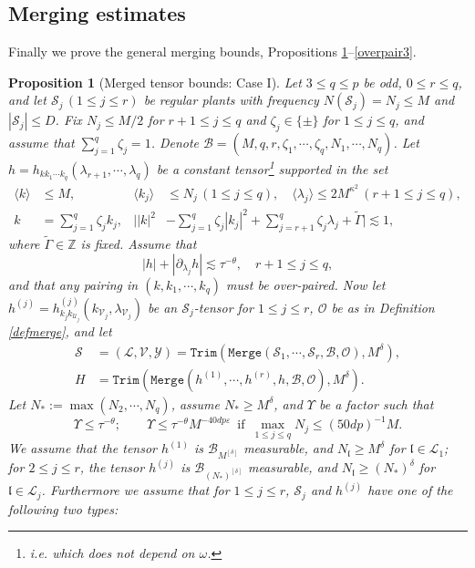 \documentclass[11 pt,reqno]{amsart}
\newtheorem{prop}[thm]{Proposition}
\theoremstyle{definition}
\theoremstyle{remark}
\numberwithin{equation}{section}
\newcommand{\Sc}{\mathcal{S}}
\newcommand{\Lc}{\mathcal{L}}
\newcommand{\Uc}{\mathcal{U}}
\newcommand{\Bc}{\mathcal{B}}
\newcommand{\Vc}{\mathcal{V}}
\newcommand{\Yc}{\mathcal{Y}}
\newcommand{\Zb}{\mathbb{Z}}
\newcommand{\lf}{\mathfrak{l}}
\newcommand{\Bs}{\mathscr{B}}
\newcommand{\Os}{\mathscr{O}}
\begin{document}
{\subsection{Merging estimates}\label{6.3} Finally we prove the general merging bounds, Propositions \ref{overpair}--\ref{overpair3}.
\begin{prop}[Merged tensor bounds: Case I]\label{overpair} Let $3\leq q\leq p$ be odd, $0\leq r\leq q$, and let $\Sc_j\,(1\leq j\leq r)$ be regular plants with frequency $N(\Sc_j)=N_j\leq M$ and $|\Sc_j|\leq D$. Fix  $N_j\leq M/2$ for $r+1\leq j\leq q$ and $\zeta_j\in\{\pm\}$ for $1\leq j\leq q$, and assume that $\sum_{j=1}^q\zeta_j=1$. Denote $\Bs=(M,q,r,\zeta_1,\cdots,\zeta_q,N_1,\cdots,N_q)$. Let $h=h_{kk_1\cdots k_q}(\lambda_{r+1},\cdots,\lambda_q)$ be a constant tensor\footnote{i.e. which does not depend on $\omega$.} supported in the set \begin{equation}\label{mergesupp}
\begin{aligned}\langle k\rangle&\leq M,&\langle k_j\rangle&\leq N_j\,(1\leq j\leq q),\quad\langle\lambda_j\rangle\leq 2M^{\kappa^2}\,(r+1\leq j\leq q),\\
k&=\sum_{j=1}^q\zeta_jk_j,&\bigg||k|^2&-\sum_{j=1}^q\zeta_j|k_j|^2+\sum_{j=r+1}^q\zeta_j\lambda_j+\widetilde{\Gamma}\bigg|\lesssim 1,
\end{aligned}\end{equation} where $\widetilde{\Gamma}\in\Zb$ is fixed. Assume that
\begin{equation}\label{mergetensor}|h|+|\partial_{\lambda_j}h|\lesssim \tau^{-\theta},\quad r+1\leq j\leq q,
\end{equation} 
and that any pairing in $(k,k_1,\cdots,k_q)$ must be over-paired.
Now let $h^{(j)}=h_{k_jk_{\Uc_j}}^{(j)}(k_{\Vc_j},\lambda_{\Vc_j})$ be an $\Sc_j$-tensor for $1\leq j\leq r$, $\Os$ be as in Definition \ref{defmerge}, and let
\begin{equation}\label{mergetrim}
\begin{aligned}\Sc&=(\Lc,\Vc,\Yc)=\mathtt{Trim}(\mathtt{Merge}(\Sc_1,\cdots,\Sc_r,\Bs,\Os),M^\delta),\\
H&=\mathtt{Trim}(\mathtt{Merge}(h^{(1)},\cdots,h^{(r)},h,\Bs,\Os),M^\delta).
\end{aligned}
\end{equation} 
Let $N_*:=\max(N_2,\cdots,N_{q})$, assume $N_*\geq M^\delta$, and $\Upsilon$ be a factor such that
\begin{equation}\label{prop5.4:Upsilon}
\Upsilon\leq \tau^{-\theta};\qquad \Upsilon\leq \tau^{-\theta}M^{-40dp\varepsilon}\,\,\,\mathrm{if}\,\,\,\max_{1\leq j\leq q}N_j\leq (50dp)^{-1}M.
\end{equation}
We assume that the tensor $h^{(1)}$ is $\Bc_{M^{[\delta]}}$ measurable, and $N_\lf\geq M^\delta$ for $\lf\in\Lc_1$; for $2\leq j\leq r$, the tensor $h^{(j)}$ is $\Bc_{(N_*)^{[\delta]}}$ measurable, and $N_\lf\geq (N_*)^\delta$ for $\lf\in\Lc_j$.
Furthermore we assume that for $1\leq j\leq r$, $\Sc_j$ and $h^{(j)}$ have one of the following two types:


\end{prop}}
\end{document}
